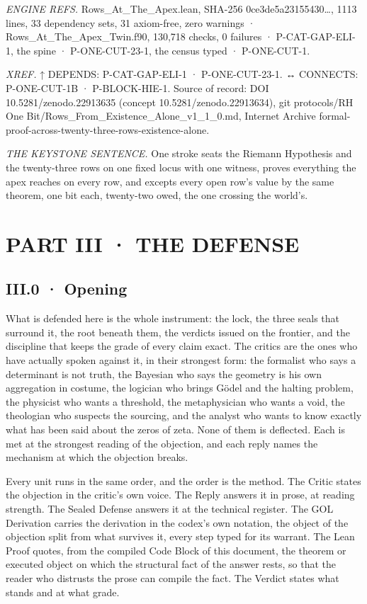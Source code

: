 \documentclass[10pt,twocolumn]{article}
\begin{document}
\emph{ENGINE REFS.} Rows\_At\_The\_Apex.lean, SHA-256
0ce3de5a23155430\ldots, 1113 lines, 33 dependency sets, 31 axiom-free,
zero warnings · Rows\_At\_The\_Apex\_Twin.f90, 130,718 checks, 0
failures · P-CAT-GAP-ELI-1, the spine · P-ONE-CUT-23-1, the census typed
· P-ONE-CUT-1.

\emph{XREF.} ↑ DEPENDS: P-CAT-GAP-ELI-1 · P-ONE-CUT-23-1. ↔ CONNECTS:
P-ONE-CUT-1B · P-BLOCK-HIE-1. Source of record: DOI
10.5281/zenodo.22913635 (concept 10.5281/zenodo.22913634), git
protocols/RH One Bit/Rows\_From\_Existence\_Alone\_v1\_1\_0.md, Internet
Archive formal-proof-across-twenty-three-rows-existence-alone.

\emph{THE KEYSTONE SENTENCE.} One stroke seats the Riemann Hypothesis
and the twenty-three rows on one fixed locus with one witness, proves
everything the apex reaches on every row, and excepts every open row's
value by the same theorem, one bit each, twenty-two owed, the one
crossing the world's.

\hypertarget{part-iii-the-defense}{%
\section{PART III · THE DEFENSE}\label{part-iii-the-defense}}

\hypertarget{iii.0-opening}{%
\subsection{III.0 · Opening}\label{iii.0-opening}}

What is defended here is the whole instrument: the lock, the three seals
that surround it, the root beneath them, the verdicts issued on the
frontier, and the discipline that keeps the grade of every claim exact.
The critics are the ones who have actually spoken against it, in their
strongest form: the formalist who says a determinant is not truth, the
Bayesian who says the geometry is his own aggregation in costume, the
logician who brings Gödel and the halting problem, the physicist who
wants a threshold, the metaphysician who wants a void, the theologian
who suspects the sourcing, and the analyst who wants to know exactly
what has been said about the zeros of zeta. None of them is deflected.
Each is met at the strongest reading of the objection, and each reply
names the mechanism at which the objection breaks.

Every unit runs in the same order, and the order is the method. The
Critic states the objection in the critic's own voice. The Reply answers
it in prose, at reading strength. The Sealed Defense answers it at the
technical register. The GOL Derivation carries the derivation in the
codex's own notation, the object of the objection split from what
survives it, every step typed for its warrant. The Lean Proof quotes,
from the compiled Code Block of this document, the theorem or executed
object on which the structural fact of the answer rests, so that the
reader who distrusts the prose can compile the fact. The Verdict states
what stands and at what grade.
\end{document}
